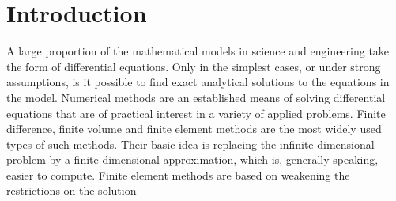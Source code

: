 \section{Introduction}
A large proportion of the mathematical models in science and engineering take the
form of differential equations. Only in the simplest cases, or under strong assumptions,
is it possible to find exact analytical solutions to the equations in the model.
%
%
%
%
%
Numerical methods are an established means of solving differential equations that are
of practical interest in a variety of applied problems. Finite difference, finite volume
and finite element methods are the most widely used types of such methods. Their
basic idea is replacing the infinite-dimensional problem by a finite-dimensional
approximation, which is, generally speaking, easier to compute.
%
Finite element methods are based on weakening the restrictions on the solution
